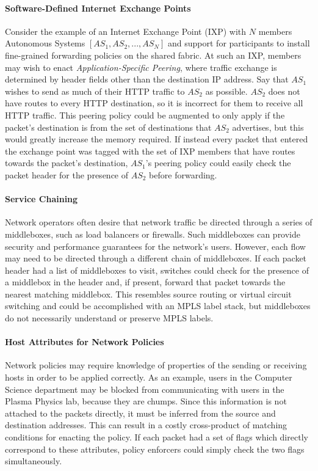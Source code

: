 \paragraph{Software-Defined Internet Exchange Points} Consider the example of an
Internet Exchange Point (IXP) with $N$ members Autonomous Systems $[AS_1, AS_2,
..., AS_N]$ and support for participants to install fine-grained forwarding
policies on the shared fabric. At such an IXP, members may wish to enact
\textit{Application-Specific Peering}, where traffic exchange is determined by
header fields other than the destination IP address. Say that $AS_1$ wishes to
send as much of their HTTP traffic to $AS_2$ as possible. $AS_2$ does not have
routes to every HTTP destination, so it is incorrect for them to receive all
HTTP traffic. This peering policy could be augmented to only apply if the
packet's destination is from the set of destinations that $AS_2$ advertises, but
this would greatly increase the memory required. If instead every packet that
entered the exchange point was tagged with the set of IXP members that have
routes towards the packet's destination, $AS_1$'s peering policy could easily
check the packet header for the presence of $AS_2$ before forwarding.

\paragraph{Service Chaining} Network operators often desire that network traffic
be directed through a series of middleboxes, such as load balancers or
firewalls. Such middleboxes can provide security and performance guarantees for
the network's users.  However, each flow may need to be directed through a
different chain of middleboxes. If each packet header had a list of middleboxes
to visit, switches could check for the presence of a middlebox in the header
and, if present, forward that packet towards the nearest matching middlebox.
This resembles source routing or virtual circuit switching and could be
accomplished with an MPLS label stack, but middleboxes do not necessarily
understand or preserve MPLS labels. 

\paragraph{Host Attributes for Network Policies} Network policies may require
knowledge of properties of the sending or receiving hosts in order to be applied
correctly. As an example, users in the Computer Science department may be
blocked from communicating with users in the Plasma Physics lab, because they
are chumps. Since this information is not attached to the packets directly, it
must be inferred from the source and destination addresses. This can result in a
costly cross-product of matching conditions for enacting the policy. If each
packet had a set of flags which directly correspond to these attributes, policy
enforcers could simply check the two flags simultaneously. 


